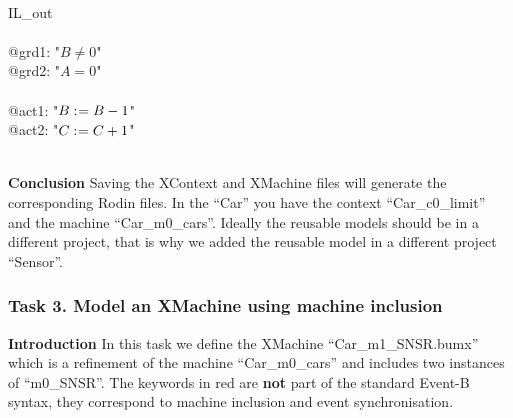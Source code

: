 \begin{description}
\begin{center}
\begin{Bcode}
			\Btab \Bend\\
			\Btab IL_out\\
			\Btab \Bwhen\\
			\Btab \Btab @grd1: "\(B \neq 0\)"\\
			\Btab \Btab @grd2: "\(A = 0\)"\\
			\Btab \Bthen\\
			\Btab \Btab @act1: "\(B \mathrel{:\mkern1mu=} B - 1\)"\\
			\Btab \Btab @act2: "\(C \mathrel{:\mkern1mu=} C + 1\)"\\
			\Btab \Bend\\
			\Bend
			\fi
		\end{Bcode}
	\end{center}
	
\end{description}
\textbf{Conclusion} Saving the XContext and XMachine files will generate the corresponding Rodin files. In the ``Car'' you have the context ``Car\_c0\_limit'' and the machine ``Car\_m0\_cars''. Ideally the reusable models should be in a different project, that is why we added the reusable model in a different project ``Sensor''.

\subsubsection{Task 3. Model an XMachine using machine inclusion}
\textbf{Introduction} In this task we define the XMachine ``Car\_m1\_SNSR.bumx'' which is a refinement of the machine ``Car\_m0\_cars'' and includes two instances of ``m0\_SNSR''. The keywords in red  are \textbf{not} part of the standard Event-B syntax, they correspond to machine inclusion and event synchronisation. 

